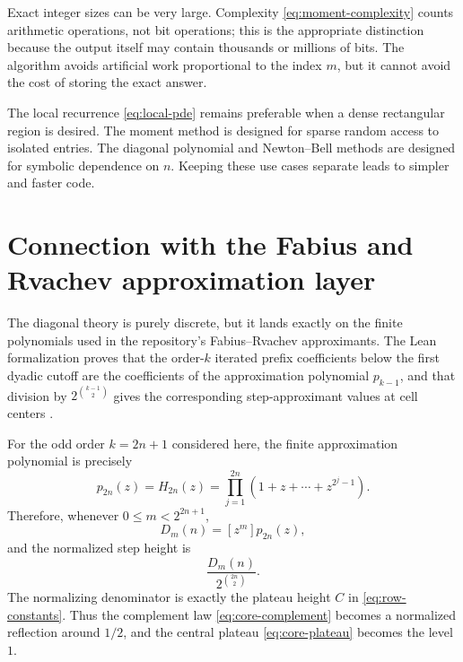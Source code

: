 \documentclass[11pt,oneside]{article}
\theoremstyle{definition}
\theoremstyle{remark}
\newcommand{\Diag}{D}
\begin{document}
Exact integer sizes can be very large.  Complexity
\eqref{eq:moment-complexity} counts arithmetic operations, not bit
operations; this is the appropriate distinction because the output itself
may contain thousands or millions of bits.  The algorithm avoids artificial
work proportional to the index $m$, but it cannot avoid the cost of storing
the exact answer.

The local recurrence \eqref{eq:local-pde} remains preferable when a dense
rectangular region is desired.  The moment method is designed for sparse
random access to isolated entries.  The diagonal polynomial and Newton--Bell
methods are designed for symbolic dependence on $n$.  Keeping these use cases
separate leads to simpler and faster code.

\section{Connection with the Fabius and Rvachev approximation layer}
\label{sec:fabius}

The diagonal theory is purely discrete, but it lands exactly on the finite
polynomials used in the repository's Fabius--Rvachev approximants.  The Lean
formalization proves that the order-$k$ iterated prefix coefficients below the
first dyadic cutoff are the coefficients of the approximation polynomial
$p_{k-1}$, and that division by
$2^{\binom{k-1}{2}}$ gives the corresponding step-approximant values at cell
centers \cite{proveit-approx}.

For the odd order $k=2n+1$ considered here, the finite approximation
polynomial is precisely
\begin{equation}
 p_{2n}(z)=H_{2n}(z)
 =\prod_{j=1}^{2n}(1+z+\cdots+z^{2^j-1}).
 \label{eq:p-H}
\end{equation}
Therefore, whenever $0\le m<2^{2n+1}$,
\begin{equation}
 \Diag_m(n)=[z^m]p_{2n}(z),
 \label{eq:D-approx-coeff}
\end{equation}
and the normalized step height is
\begin{equation}
 \frac{\Diag_m(n)}{2^{\binom{2n}{2}}}.
 \label{eq:normalized-edge}
\end{equation}
The normalizing denominator is exactly the plateau height $C$ in
\eqref{eq:row-constants}.  Thus the complement law
\eqref{eq:core-complement} becomes a normalized reflection around $1/2$,
and the central plateau \eqref{eq:core-plateau} becomes the level $1$.
\end{document}
